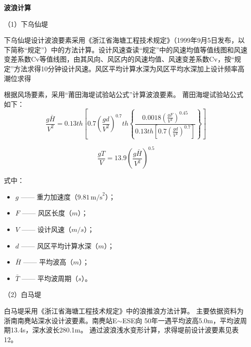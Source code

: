 \documentclass[UTF8, a4paper, 12pt]{ctexart} %
\begin{document}
\par



\textbf{波浪计算}

\par


\par（1）下乌仙堤
\par
下乌仙堤设计波浪要素采用《浙江省海塘工程技术规定》（1999年9月5日发布，以下简称“规定”）中的方法计算。设计风速查读“规定”中的风速均值等值线图和风速变差系数Cv等值线图，由其风向、风区内的风速均值、风速变差系数Cv，按“规定”方法求得10分钟设计风速。风区平均计算水深为风区平均水深加上设计频率高潮位求得
\par
根据风场要素，采用“莆田海堤试验站公式”计算波浪要素。
莆田海堤试验站公式如下：
\begin{equation}
    \frac{g\bar{H}}{V^2} = 0.13 th \left[ 0.7 \left( \frac{g d}{V^2} \right)^{0.7} th \left\{ 
    \frac{0.0018 \left( \frac{g F}{V^2} \right)^{0.45}}{0.13 th \left[ 0.7 \left( \frac{g d}{V^2} \right)^{0.7} \right]} 
    \right\} \right]
    \label{eq:wave_height}
\end{equation}

\begin{equation}
    \frac{gT}{V} = 13.9 \left( \frac{g\bar{H}}{V^2} \right)^{0.5}
    \label{eq:wave_period}
\end{equation}

式中：
\begin{itemize}
    \item $g$ —— 重力加速度（$9.81\,\text{m/s}^2$）；
    \item $F$ —— 风区长度（$m$）；
    \item $V$ —— 设计风速（$m/s$）；
    \item $d$ —— 风区平均计算水深（$m$）；
    \item $\bar{H}$ —— 平均波高（$m$）；
    \item $\bar{T}$ —— 平均波周期（$s$）。
\end{itemize}
\par
（2）白马堤
\par
白马堤采用《浙江省海塘工程技术规定》中的浪推浪方法计算。
主要依据资料为浙南南麂站深水设计波要素。南麂站E$\sim$ESE向 50年一遇平均波高5.0m，平均波周期13.4s，深水波长280.1m。
通过波浪浅水变形计算，求得堤前设计波要素见表12。
\end{document}
